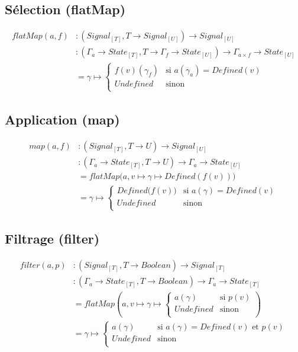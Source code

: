 	\subsection*{Sélection (flatMap)}
		
		\begin{align*}
			flatMap(a, f)
				&\colon (Signal_{[T]}, T \to Signal_{[U]}) \to Signal_{[U]} \\
				&\colon (\Gamma_a \to State_{[T]}, T \to \Gamma_f \to State_{[U]}) \to \Gamma_{a \times f} \to State_{[U]} \\
				&= \gamma \mapsto \begin{cases}
					f(v)(\gamma_f) & \text{si } a(\gamma_a) = Defined(v)\\
					Undefined & \text{sinon}\\
				\end{cases}
		\end{align*}
	
	\subsection*{Application (map)}
		
		\begin{align*}
			map(a, f)
				&\colon (Signal_{[T]}, T \to U) \to Signal_{[U]} \\
				&\colon (\Gamma_a \to State_{[T]}, T \to U) \to \Gamma_a \to State_{[U]} \\
				&= flatMap \big( a, v \mapsto \gamma \mapsto Defined(f(v)) \big)\\
				&= \gamma \mapsto \begin{cases}
					Defined \big(f (v) \big) & \text{si } a(\gamma) = Defined(v)\\
					Undefined & \text{sinon}\\
				\end{cases}
		\end{align*}
	
	\subsection*{Filtrage (filter)}
	
		\begin{align*}
			filter(a, p)
				&\colon (Signal_{[T]}, T \to Boolean) \to Signal_{[T]} \\
				&\colon (\Gamma_a \to State_{[T]}, T \to Boolean) \to \Gamma_a \to State_{[T]} \\
				&= flatMap \left( a, v \mapsto \gamma \mapsto \begin{cases}
					a(\gamma) & \text{si } p(v)\\
					Undefined & \text{sinon}\\
				\end{cases} \right)\\
				&= \gamma \mapsto \begin{cases}
					a(\gamma) & \text{si } a(\gamma) = Defined(v) \text{ et } p(v)\\
					Undefined & \text{sinon}\\
				\end{cases}
		\end{align*}
		
